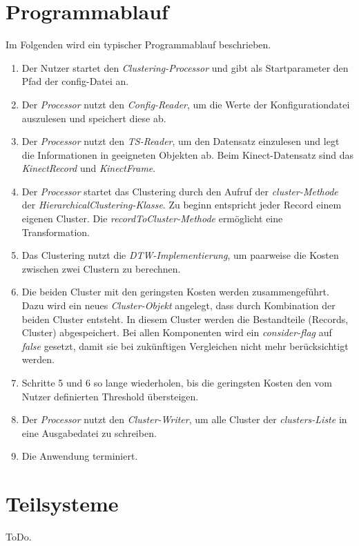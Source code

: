\section{Programmablauf}
\label{4-Programmablauf}
Im Folgenden wird ein typischer Programmablauf beschrieben.
\begin{enumerate}
    \item Der Nutzer startet den \emph{Clustering-Processor} und gibt als Startparameter den Pfad der config-Datei an.
    \item Der \emph{Processor} nutzt den \emph{Config-Reader}, um die Werte der Konfigurationdatei auszulesen
    und speichert diese ab.
    \item Der \emph{Processor} nutzt den \emph{TS-Reader}, um den Datensatz einzulesen
    und legt die Informationen in geeigneten Objekten ab.
    Beim Kinect-Datensatz sind das \emph{KinectRecord} und \emph{KinectFrame}.
    \item Der \emph{Processor} startet das Clustering durch den Aufruf der \emph{cluster-Methode}
    der \emph{HierarchicalClustering-Klasse}.
    Zu beginn entspricht jeder Record einem eigenen Cluster.
    Die \emph{recordToCluster-Methode} ermöglicht eine Transformation.
    \item Das Clustering nutzt die \emph{\ac{DTW}-Implementierung},
    um paarweise die Kosten zwischen zwei Clustern zu berechnen.
    \item Die beiden Cluster mit den geringsten Kosten werden zusammengeführt.
    Dazu wird ein neues \emph{Cluster-Objekt} angelegt, dass durch Kombination der beiden Cluster entsteht.
    In diesem Cluster werden die Bestandteile (Records, Cluster) abgespeichert.
    Bei allen Komponenten wird ein \emph{consider-flag} auf \emph{false} gesetzt,
    damit sie bei zukünftigen Vergleichen nicht mehr berücksichtigt werden.
    \item Schritte 5 und 6 so lange wiederholen, bis die geringsten Kosten den vom Nutzer definierten Threshold übersteigen.
    \item Der \emph{Processor} nutzt den \emph{Cluster-Writer}, um alle Cluster der \emph{clusters-Liste}
    in eine Ausgabedatei zu schreiben.
    \item Die Anwendung terminiert. 

\end{enumerate}


\section{Teilsysteme}
\label{4-Teilsysteme}
ToDo.

